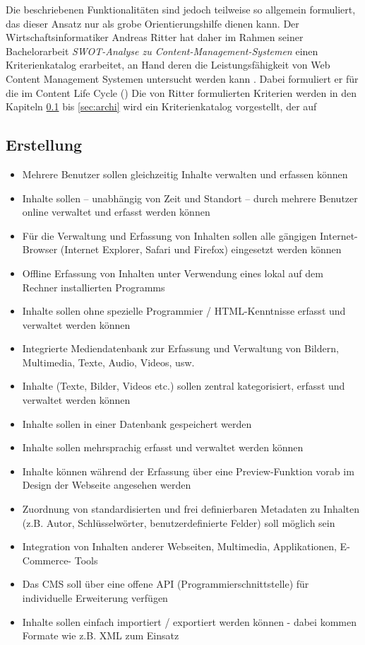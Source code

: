 Die beschriebenen Funktionalitäten sind jedoch teilweise so allgemein formuliert, das dieser Ansatz nur als grobe Orientierungshilfe dienen kann. Der Wirtschaftsinformatiker Andreas Ritter hat daher im Rahmen seiner Bachelorarbeit \emph{SWOT-Analyse zu Content-Management-Systemen} \cite{RitterSwot} einen Kriterienkatalog erarbeitet, an Hand deren die Leistungsfähigkeit von Web Content Management Systemen untersucht werden kann \citep[][Seite 21-23]{RitterSwot}. Dabei formuliert er für die im Content Life Cycle ()
Die von Ritter formulierten Kriterien werden in den Kapiteln \ref{sec:erstellung} bis \ref{sec:archi} wird ein Kriterienkatalog vorgestellt, der auf

\subsection{Erstellung}
\label{sec:erstellung}
\begin{itemize}
\item
Mehrere Benutzer sollen gleichzeitig Inhalte verwalten und erfassen können
\item
Inhalte sollen – unabhängig von Zeit und Standort – durch mehrere Benutzer online verwaltet und erfasst werden können
\item
Für die Verwaltung und Erfassung von Inhalten sollen alle gängigen Internet-Browser (Internet Explorer, Safari und Firefox) eingesetzt werden können
\item
Offline Erfassung von Inhalten unter Verwendung eines lokal auf dem Rechner installierten Programms
\item
Inhalte sollen ohne spezielle Programmier / HTML-Kenntnisse erfasst und verwaltet werden können
\item
Integrierte Mediendatenbank zur Erfassung und Verwaltung von Bildern, Multimedia, Texte, Audio, Videos, usw.
\item
Inhalte (Texte, Bilder, Videos etc.) sollen zentral kategorisiert, erfasst und verwaltet werden können
\item
Inhalte sollen in einer Datenbank gespeichert werden
\item
Inhalte sollen mehrsprachig erfasst und verwaltet werden können
\item
Inhalte können während der Erfassung über eine Preview-Funktion vorab im Design der Webseite angesehen werden
\item
Zuordnung von standardisierten und frei definierbaren Metadaten zu Inhalten (z.B. Autor, Schlüsselwörter, benutzerdefinierte Felder) soll möglich sein
\item
Integration von Inhalten anderer Webseiten, Multimedia, Applikationen, E-Commerce- Tools
\item
Das CMS soll über eine offene API (Programmierschnittstelle) für individuelle Erweiterung verfügen
\item
Inhalte sollen einfach importiert / exportiert werden können - dabei kommen Formate wie z.B. XML zum Einsatz
\end{itemize}



